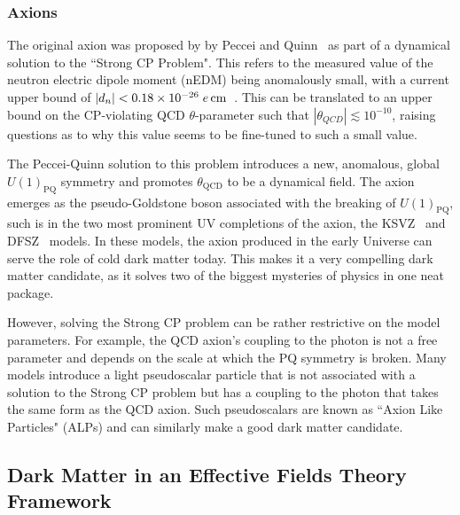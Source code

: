 \subsubsection{Axions}

The original axion was proposed by by Peccei and Quinn~\cite{Peccei:1977hh_CPConservationPresence} as part of a dynamical solution to the ``Strong CP Problem". This refers to the measured value of the neutron electric dipole moment (nEDM) being anomalously small, with a current upper bound of $|d_n| < 0.18\times 10^{-26}\;e{\rm \,cm}$~\cite{Abel:2020pzs_feb_MeasurementPermanentElectric}. This can be translated to an upper bound on the CP-violating QCD $\theta$-parameter such that $|\theta_{QCD}|\lesssim 10^{-10}$, raising questions as to why this value seems to be fine-tuned to such a small value. 

The Peccei-Quinn solution to this problem introduces a new, anomalous, global  $U(1)_{\mathrm{PQ}}$ symmetry and promotes $\theta_\mathrm{QCD}$ to be a dynamical field.
The axion emerges as the pseudo-Goldstone boson associated with the breaking of $U(1)_\mathrm{PQ}$, such is in the two most prominent UV completions of the axion, the KSVZ~\cite{Kim:1979if_WeakInteractionSinglet, Shifman:1979if_CanConfinementEnsure} and DFSZ~\cite{_PossibleSuppressionAxion, Dine:1981rt_SimpleSolutionStrong} models. In these models, the axion produced in the early Universe can serve the role of cold dark matter today. This makes it a very compelling dark matter candidate, as it solves two of the biggest mysteries of physics in one neat package. 

However, solving the Strong CP problem can be rather restrictive on the model parameters. For example, the QCD axion's coupling to the photon is not a free parameter and depends on the scale at which the PQ symmetry is broken. Many models introduce a light pseudoscalar particle that is not associated with a solution to the Strong CP problem but has a coupling to the photon that takes the same form as the QCD axion. Such pseudoscalars are known as ``Axion Like Particles" (ALPs) and can similarly make a good dark matter candidate.


\subsection{Dark Matter in an Effective Fields Theory Framework}
\label{subsec:DM_EFTs}

